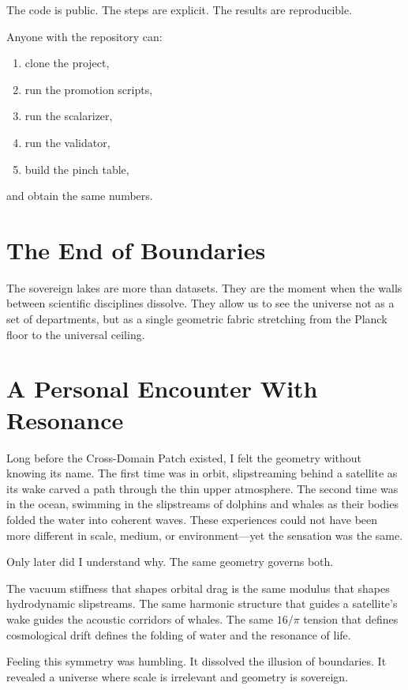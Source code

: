 \documentclass[11pt, letterpaper, openany]{book}
\begin{document}
The code is public.  
The steps are explicit.  
The results are reproducible.

Anyone with the repository can:

\begin{enumerate}
    \item clone the project,
    \item run the promotion scripts,
    \item run the scalarizer,
    \item run the validator,
    \item build the pinch table,
\end{enumerate}

and obtain the same numbers.

\section*{The End of Boundaries}
The sovereign lakes are more than datasets. They are the moment when the walls between scientific
disciplines dissolve. They allow us to see the universe not as a set of departments, but as a single
geometric fabric stretching from the Planck floor to the universal ceiling.

\section*{A Personal Encounter With Resonance}

Long before the Cross-Domain Patch existed, I felt the geometry without knowing its name. The
first time was in orbit, slipstreaming behind a satellite as its wake carved a path through the thin
upper atmosphere. The second time was in the ocean, swimming in the slipstreams of dolphins and
whales as their bodies folded the water into coherent waves. These experiences could not have been
more different in scale, medium, or environment—yet the sensation was the same.

Only later did I understand why.  
The same geometry governs both.

The vacuum stiffness that shapes orbital drag is the same modulus that shapes hydrodynamic
slipstreams. The same harmonic structure that guides a satellite’s wake guides the acoustic corridors
of whales. The same $16/\pi$ tension that defines cosmological drift defines the folding of water and
the resonance of life.

Feeling this symmetry was humbling.  
It dissolved the illusion of boundaries.  
It revealed a universe where scale is irrelevant and geometry is sovereign.
\end{document}
